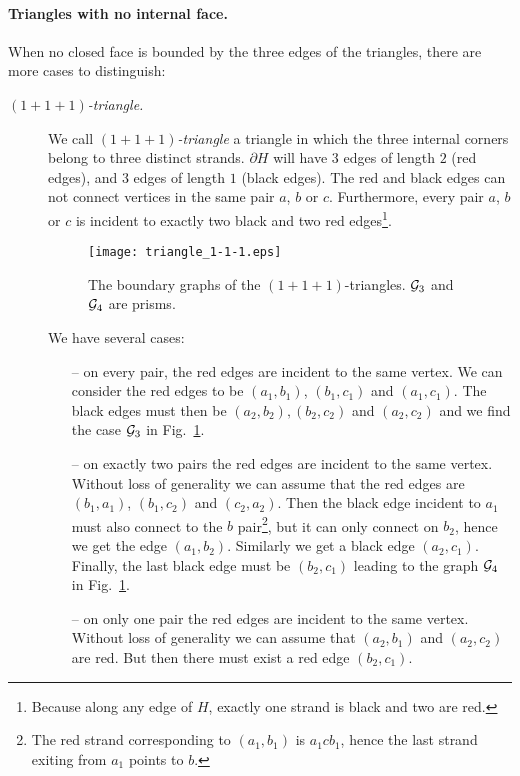 \documentclass[10pt]{article}
\theoremstyle{plain}
\theoremstyle{definition}
\newcommand{\cG}{{\cal G}}
\begin{document}
\paragraph{Triangles with no internal face.} When no closed face is bounded by the three edges of the triangles, there are more cases to distinguish:
\begin{description}
 \item[\it $(1+1+1)$-triangle.]
We call \emph{$(1+1+1)$-triangle} a triangle in which the three internal corners belong to three distinct strands.
$\partial H$ will have $3$ edges of length $2$ (red edges), and 3 edges of length $1$ (black edges).
The red and black edges can not connect vertices in the same pair $a$, $b$ or $c$. Furthermore, 
every pair $a$, $b$ or $c$ is incident to exactly two black and two red edges\footnote{Because along any edge of $H$, exactly one strand is black and two are red.}.
\begin{figure}[htb]
 \begin{center}
 \texttt{[image: triangle\_1-1-1.eps]}  
 \caption{The boundary graphs of the $(1+1+1)$-triangles. $\cG_3$ and $\cG_4$ are prisms.} \label{fig:triangle_1-1-1}
 \end{center}
 \end{figure}
We have several cases:
\begin{itemize}
 \item[--] on every pair, the red edges are incident to the same vertex. We can consider the red edges to be $(a_1,b_1)$, $(b_1,c_1)$ and $(a_1,c_1)$.
 The black edges must then be $(a_2,b_2),(b_2,c_2)$ and $(a_2,c_2)$ and we find the case $\cG_3$ in Fig.~\ref{fig:triangle_1-1-1}.
 \item[--] on exactly two pairs the red edges are incident to the same vertex. Without loss of generality we can assume that the red edges are $(b_1,a_1)$, $(b_1,c_2)$ and $(c_2,a_2)$. 
  Then the black edge incident to $a_1$ must also connect to the $b$ pair\footnote{The red strand corresponding to $(a_1,b_1)$ is $a_1cb_1$, hence the 
  last strand exiting from $a_1$ points to $b$.}, 
  but it can only connect on $b_2$, hence we get the edge $(a_1,b_2)$. Similarly we get a black edge $(a_2,c_1)$. Finally, the last black edge must be 
  $(b_2,c_1)$ leading to the graph $\cG_4$ in Fig.~\ref{fig:triangle_1-1-1}.
 \item[--] on only one pair the red edges are incident to the same vertex. Without loss of generality we can assume that $(a_2,b_1)$ and $(a_2,c_2)$ are red. But then there must exist a red edge $(b_2,c_1)$.

\end{itemize}
\end{description}
\end{document}
